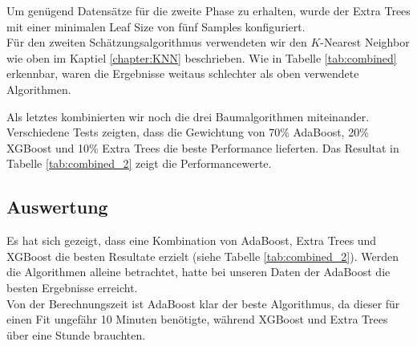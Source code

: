 Um genügend Datensätze für die zweite Phase zu erhalten, wurde der Extra Trees mit einer minimalen Leaf Size von fünf Samples konfiguriert.\\
Für den zweiten Schätzungsalgorithmus verwendeten wir den $K$-Nearest Neighbor wie oben im Kaptiel \ref{chapter:KNN} beschrieben. Wie in Tabelle \ref{tab:combined} erkennbar, waren die Ergebnisse weitaus schlechter als oben verwendete Algorithmen.

\begin{table}[ht]
\centering
{}
\caption{Ergebnisse des selbst entwickelten Algorithmus}
\label{tab:combined}
\end{table}

Als letztes kombinierten wir noch die drei Baumalgorithmen miteinander. Verschiedene Tests zeigten, dass die Gewichtung von 70\% AdaBoost, 20\% XGBoost und 10\% Extra Trees die beste Performance lieferten.
Das Resultat in Tabelle \ref{tab:combined_2} zeigt die Performancewerte.

\begin{table}[ht]
\centering
{}
\caption{Kombination von AdaBoost, XGBoost und Extra Trees}
\label{tab:combined_2}
\end{table}

\subsection{Auswertung}
Es hat sich gezeigt, dass eine Kombination von AdaBoost, Extra Trees und XGBoost die besten Resultate erzielt (siehe Tabelle \ref{tab:combined_2}). Werden die Algorithmen alleine betrachtet, hatte bei unseren Daten der AdaBoost die besten Ergebnisse erreicht.\\
Von der Berechnungszeit ist AdaBoost klar der beste Algorithmus, da dieser für einen Fit ungefähr 10 Minuten benötigte, während XGBoost und Extra Trees über eine Stunde brauchten.


